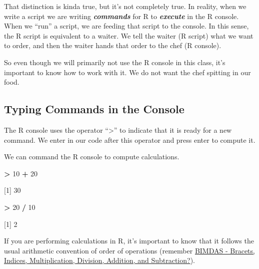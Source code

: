 \documentclass[
]{book}
\newenvironment{Shaded}{\begin{snugshade}}{\end{snugshade}}
\newcommand{\DecValTok}[1]{\textcolor[rgb]{0.00,0.00,0.81}{#1}}
\newcommand{\NormalTok}[1]{#1}
\newcommand{\SpecialCharTok}[1]{\textcolor[rgb]{0.81,0.36,0.00}{\textbf{#1}}}
\begin{document}
That distinction is kinda true, but it's not completely true. In reality, when we write a script we are writing \textbf{\emph{commands}} for R to \textbf{\emph{execute}} in the R console. When we ``run'' a script, we are feeding that script to the console. In this sense, the R script is equivalent to a waiter. We tell the waiter (R script) what we want to order, and then the waiter hands that order to the chef (R console).

So even though we will primarily not use the R console in this class, it's important to know how to work with it. We do not want the chef spitting in our food.

\hypertarget{typing-commands-in-the-console}{%
\subsection{Typing Commands in the Console}\label{typing-commands-in-the-console}}

The R console uses the operator ``\textgreater{}'' to indicate that it is ready for a new command. We enter in our code after this operator and press enter to compute it.

We can command the R console to compute calculations.

\begin{Shaded}
\begin{Highlighting}[]
\SpecialCharTok{\textgreater{}} \DecValTok{10} \SpecialCharTok{+} \DecValTok{20}

\NormalTok{[}\DecValTok{1}\NormalTok{] }\DecValTok{30}
\end{Highlighting}
\end{Shaded}

\begin{Shaded}
\begin{Highlighting}[]
\SpecialCharTok{\textgreater{}} \DecValTok{20} \SpecialCharTok{/} \DecValTok{10}

\NormalTok{[}\DecValTok{1}\NormalTok{] }\DecValTok{2}
\end{Highlighting}
\end{Shaded}

If you are performing calculations in R, it's important to know that it follows the usual arithmetic convention of order of operations (remember \href{https://www.tes.com/en-ie/teaching-resource/bidmas-bodmas-bedmas-bimdas-pemdas-permdas-11154272\#:~:text=\%E2\%80\%A2\%20BIMDAS\%20\%2D\%20Brackets\%2C\%20Indices\%2C,Multiplication\%2C\%20Division\%2C\%20Addition\%2C\%20Subtraction}{BIMDAS - Bracets, Indices, Multiplication, Division, Addition, and Subtraction?}).
\end{document}
